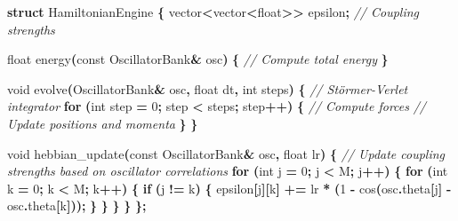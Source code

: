 \documentclass[
  11pt,
  a4paper,
]{article}
\newenvironment{Shaded}{\begin{snugshade}}{\end{snugshade}}
\newcommand{\AttributeTok}[1]{\textcolor[rgb]{0.13,0.29,0.53}{#1}}
\newcommand{\CommentTok}[1]{\textcolor[rgb]{0.56,0.35,0.01}{\textit{#1}}}
\newcommand{\ControlFlowTok}[1]{\textcolor[rgb]{0.13,0.29,0.53}{\textbf{#1}}}
\newcommand{\DataTypeTok}[1]{\textcolor[rgb]{0.13,0.29,0.53}{#1}}
\newcommand{\DecValTok}[1]{\textcolor[rgb]{0.00,0.00,0.81}{#1}}
\newcommand{\KeywordTok}[1]{\textcolor[rgb]{0.13,0.29,0.53}{\textbf{#1}}}
\newcommand{\NormalTok}[1]{#1}
\newcommand{\OperatorTok}[1]{\textcolor[rgb]{0.81,0.36,0.00}{\textbf{#1}}}
\begin{document}
\begin{Shaded}
\begin{Highlighting}[]
\KeywordTok{struct}\NormalTok{ HamiltonianEngine }\OperatorTok{\{}
\NormalTok{    vector}\OperatorTok{\textless{}}\NormalTok{vector}\OperatorTok{\textless{}}\DataTypeTok{float}\OperatorTok{\textgreater{}\textgreater{}}\NormalTok{ epsilon}\OperatorTok{;}  \CommentTok{// Coupling strengths}
    
    \DataTypeTok{float}\NormalTok{ energy}\OperatorTok{(}\AttributeTok{const}\NormalTok{ OscillatorBank}\OperatorTok{\&}\NormalTok{ osc}\OperatorTok{)} \OperatorTok{\{}
        \CommentTok{// Compute total energy}
    \OperatorTok{\}}
    
    \DataTypeTok{void}\NormalTok{ evolve}\OperatorTok{(}\NormalTok{OscillatorBank}\OperatorTok{\&}\NormalTok{ osc}\OperatorTok{,} \DataTypeTok{float}\NormalTok{ dt}\OperatorTok{,} \DataTypeTok{int}\NormalTok{ steps}\OperatorTok{)} \OperatorTok{\{}
        \CommentTok{// Störmer{-}Verlet integrator}
        \ControlFlowTok{for} \OperatorTok{(}\DataTypeTok{int}\NormalTok{ step }\OperatorTok{=} \DecValTok{0}\OperatorTok{;}\NormalTok{ step }\OperatorTok{\textless{}}\NormalTok{ steps}\OperatorTok{;}\NormalTok{ step}\OperatorTok{++)} \OperatorTok{\{}
            \CommentTok{// Compute forces}
            \CommentTok{// Update positions and momenta}
        \OperatorTok{\}}
    \OperatorTok{\}}
    
    \DataTypeTok{void}\NormalTok{ hebbian\_update}\OperatorTok{(}\AttributeTok{const}\NormalTok{ OscillatorBank}\OperatorTok{\&}\NormalTok{ osc}\OperatorTok{,} \DataTypeTok{float}\NormalTok{ lr}\OperatorTok{)} \OperatorTok{\{}
        \CommentTok{// Update coupling strengths based on oscillator correlations}
        \ControlFlowTok{for} \OperatorTok{(}\DataTypeTok{int}\NormalTok{ j }\OperatorTok{=} \DecValTok{0}\OperatorTok{;}\NormalTok{ j }\OperatorTok{\textless{}}\NormalTok{ M}\OperatorTok{;}\NormalTok{ j}\OperatorTok{++)} \OperatorTok{\{}
            \ControlFlowTok{for} \OperatorTok{(}\DataTypeTok{int}\NormalTok{ k }\OperatorTok{=} \DecValTok{0}\OperatorTok{;}\NormalTok{ k }\OperatorTok{\textless{}}\NormalTok{ M}\OperatorTok{;}\NormalTok{ k}\OperatorTok{++)} \OperatorTok{\{}
                \ControlFlowTok{if} \OperatorTok{(}\NormalTok{j }\OperatorTok{!=}\NormalTok{ k}\OperatorTok{)} \OperatorTok{\{}
\NormalTok{                    epsilon}\OperatorTok{[}\NormalTok{j}\OperatorTok{][}\NormalTok{k}\OperatorTok{]} \OperatorTok{+=}\NormalTok{ lr }\OperatorTok{*} \OperatorTok{(}\DecValTok{1} \OperatorTok{{-}}\NormalTok{ cos}\OperatorTok{(}\NormalTok{osc}\OperatorTok{.}\NormalTok{theta}\OperatorTok{[}\NormalTok{j}\OperatorTok{]} \OperatorTok{{-}}\NormalTok{ osc}\OperatorTok{.}\NormalTok{theta}\OperatorTok{[}\NormalTok{k}\OperatorTok{]));}
                \OperatorTok{\}}
            \OperatorTok{\}}
        \OperatorTok{\}}
    \OperatorTok{\}}
\OperatorTok{\};}
\end{Highlighting}
\end{Shaded}
\end{document}
